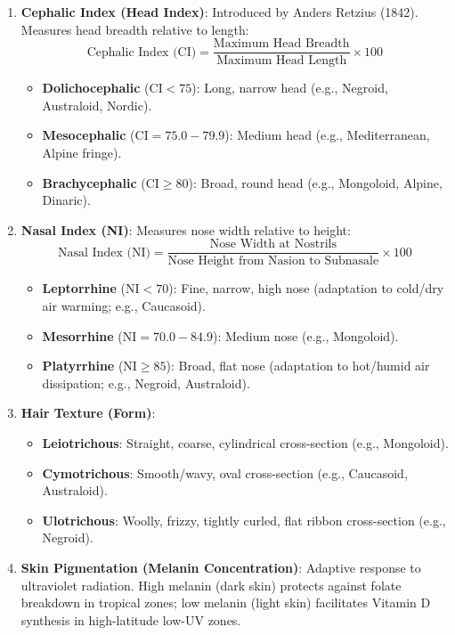 \documentclass[11pt,a4paper]{article}
\begin{document}
\begin{enumerate}[leftmargin=*]
  \item \textbf{Cephalic Index (Head Index)}: Introduced by Anders Retzius (1842). Measures head breadth relative to length:
  \begin{equation}
    \text{Cephalic Index (CI)} = \frac{\text{Maximum Head Breadth}}{\text{Maximum Head Length}} \times 100
  \end{equation}
  \begin{itemize}
    \item \textbf{Dolichocephalic} ($\text{CI} < 75$): Long, narrow head (e.g., Negroid, Australoid, Nordic).
    \item \textbf{Mesocephalic} ($\text{CI} = 75.0 - 79.9$): Medium head (e.g., Mediterranean, Alpine fringe).
    \item \textbf{Brachycephalic} ($\text{CI} \ge 80$): Broad, round head (e.g., Mongoloid, Alpine, Dinaric).
  \end{itemize}

  \item \textbf{Nasal Index (NI)}: Measures nose width relative to height:
  \begin{equation}
    \text{Nasal Index (NI)} = \frac{\text{Nose Width at Nostrils}}{\text{Nose Height from Nasion to Subnasale}} \times 100
  \end{equation}
  \begin{itemize}
    \item \textbf{Leptorrhine} ($\text{NI} < 70$): Fine, narrow, high nose (adaptation to cold/dry air warming; e.g., Caucasoid).
    \item \textbf{Mesorrhine} ($\text{NI} = 70.0 - 84.9$): Medium nose (e.g., Mongoloid).
    \item \textbf{Platyrrhine} ($\text{NI} \ge 85$): Broad, flat nose (adaptation to hot/humid air dissipation; e.g., Negroid, Australoid).
  \end{itemize}

  \item \textbf{Hair Texture (Form)}:
  \begin{itemize}
    \item \textbf{Leiotrichous}: Straight, coarse, cylindrical cross-section (e.g., Mongoloid).
    \item \textbf{Cymotrichous}: Smooth/wavy, oval cross-section (e.g., Caucasoid, Australoid).
    \item \textbf{Ulotrichous}: Woolly, frizzy, tightly curled, flat ribbon cross-section (e.g., Negroid).
  \end{itemize}

  \item \textbf{Skin Pigmentation (Melanin Concentration)}: Adaptive response to ultraviolet radiation. High melanin (dark skin) protects against folate breakdown in tropical zones; low melanin (light skin) facilitates Vitamin D synthesis in high-latitude low-UV zones.
\end{enumerate}
\end{document}
